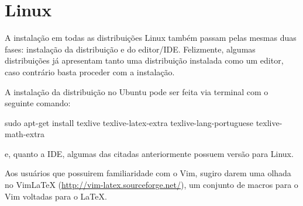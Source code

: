 \section{Linux}

A instalação em todas as distribuições Linux também passam pelas mesmas duas fases: instalação da distribuição e do editor/IDE. Felizmente, algumas distribuições já apresentam tanto uma distribuição instalada como um editor, caso contrário basta proceder com a instalação.

A instalação da distribuição no Ubuntu pode ser feita via terminal com o seguinte comando:
\begin{code}
    sudo apt-get install texlive texlive-latex-extra texlive-lang-portuguese texlive-math-extra
\end{code}
e, quanto a IDE, algumas das citadas anteriormente possuem versão para Linux.

Aos usuários que possuirem familiaridade com o Vim, sugiro darem uma olhada no VimLaTeX (\url{http://vim-latex.sourceforge.net/}), um conjunto de macros para o Vim voltadas para o LaTeX.
